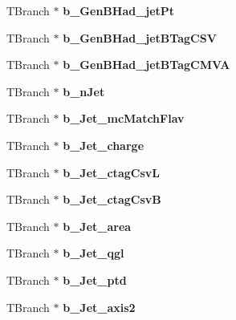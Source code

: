 \begin{DoxyCompactItemize}
T\+Branch $\ast$ {\bfseries b\+\_\+\+Gen\+B\+Had\+\_\+jet\+Pt}
\item 
\hypertarget{classMiniTree_afe2b942717dd871d5f3a65be0bbdaffe}{}\label{classMiniTree_afe2b942717dd871d5f3a65be0bbdaffe} 
T\+Branch $\ast$ {\bfseries b\+\_\+\+Gen\+B\+Had\+\_\+jet\+B\+Tag\+C\+SV}
\item 
\hypertarget{classMiniTree_ad97d8cb62c9ed2f5fd9ea0aa92b780ef}{}\label{classMiniTree_ad97d8cb62c9ed2f5fd9ea0aa92b780ef} 
T\+Branch $\ast$ {\bfseries b\+\_\+\+Gen\+B\+Had\+\_\+jet\+B\+Tag\+C\+M\+VA}
\item 
\hypertarget{classMiniTree_aa9f0eb18eca45a4484431e84e92e9a00}{}\label{classMiniTree_aa9f0eb18eca45a4484431e84e92e9a00} 
T\+Branch $\ast$ {\bfseries b\+\_\+n\+Jet}
\item 
\hypertarget{classMiniTree_a7787b94ac818e9c10df13c7fef55365b}{}\label{classMiniTree_a7787b94ac818e9c10df13c7fef55365b} 
T\+Branch $\ast$ {\bfseries b\+\_\+\+Jet\+\_\+mc\+Match\+Flav}
\item 
\hypertarget{classMiniTree_a3e8fb71136d5e3290da7cbaed25965ee}{}\label{classMiniTree_a3e8fb71136d5e3290da7cbaed25965ee} 
T\+Branch $\ast$ {\bfseries b\+\_\+\+Jet\+\_\+charge}
\item 
\hypertarget{classMiniTree_a09e77ae38d5948ea30d2de13530f40a9}{}\label{classMiniTree_a09e77ae38d5948ea30d2de13530f40a9} 
T\+Branch $\ast$ {\bfseries b\+\_\+\+Jet\+\_\+ctag\+CsvL}
\item 
\hypertarget{classMiniTree_a28a678727ccc253a4eaa1bc8d8a0f316}{}\label{classMiniTree_a28a678727ccc253a4eaa1bc8d8a0f316} 
T\+Branch $\ast$ {\bfseries b\+\_\+\+Jet\+\_\+ctag\+CsvB}
\item 
\hypertarget{classMiniTree_a4892027b271d9fcf3a0109c702b09910}{}\label{classMiniTree_a4892027b271d9fcf3a0109c702b09910} 
T\+Branch $\ast$ {\bfseries b\+\_\+\+Jet\+\_\+area}
\item 
\hypertarget{classMiniTree_ad68910560d3bb5aff733b38107d1d719}{}\label{classMiniTree_ad68910560d3bb5aff733b38107d1d719} 
T\+Branch $\ast$ {\bfseries b\+\_\+\+Jet\+\_\+qgl}
\item 
\hypertarget{classMiniTree_a44764bb619f37acaf110b6ecbe793fc1}{}\label{classMiniTree_a44764bb619f37acaf110b6ecbe793fc1} 
T\+Branch $\ast$ {\bfseries b\+\_\+\+Jet\+\_\+ptd}
\item 
\hypertarget{classMiniTree_a1d8684599e83859ea85a5442894d794c}{}\label{classMiniTree_a1d8684599e83859ea85a5442894d794c} 
T\+Branch $\ast$ {\bfseries b\+\_\+\+Jet\+\_\+axis2}
\item 
\hypertarget{classMiniTree_a391e845965a76b4d86bc7f40f85f345f}{}\label{classMiniTree_a391e845965a76b4d86bc7f40f85f345f} 

\end{DoxyCompactItemize}
